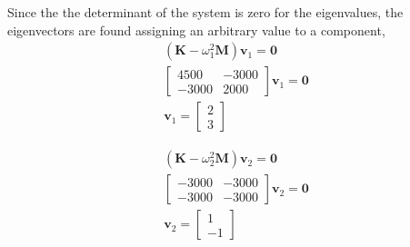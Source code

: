 \begin{Answer}[ref={two_storey}]
Since the the determinant of the system is zero for the eigenvalues, the eigenvectors are found assigning an arbitrary value to a component,
\begin{align*}
(\mathbf{K} -\omega_1^2\mathbf{M})\mathbf{v}_1 = \mathbf{0} \\
\begin{bmatrix}
    4500 & -3000 \\
    -3000 & 2000
\end{bmatrix} \mathbf{v}_1 = \mathbf{0} \\
\mathbf{v}_1 = \begin{bmatrix}
    2 \\ 3
\end{bmatrix}
\end{align*}

\begin{align*}
(\mathbf{K} -\omega_2^2\mathbf{M})\mathbf{v}_2 = \mathbf{0} \\
\begin{bmatrix}
    -3000 & -3000 \\
    -3000 & -3000
\end{bmatrix} \mathbf{v}_2 = \mathbf{0} \\
\mathbf{v}_2 = \begin{bmatrix}
    1 \\ -1
\end{bmatrix}
\end{align*}



\end{Answer}
